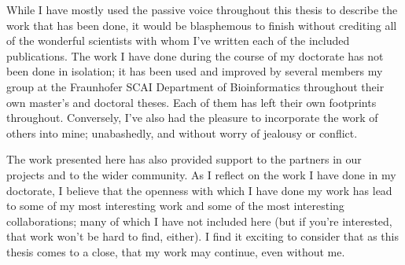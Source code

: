While I have mostly used the passive voice throughout this thesis to describe the work that has been done, it would be blasphemous to finish without crediting all of the wonderful scientists with whom I've written each of the included publications.
The work I have done during the course of my doctorate has not been done in isolation; it has been used and improved by several members my group at the Fraunhofer SCAI Department of Bioinformatics throughout their own master's and doctoral theses.
Each of them has left their own footprints throughout.
Conversely, I've also had the pleasure to incorporate the work of others into mine; unabashedly, and without worry of jealousy or conflict.

The work presented here has also provided support to the partners in our projects and to the wider community.
As I reflect on the work I have done in my doctorate, I believe that the openness with which I have done my work has lead to some of my most interesting work and some of the most interesting collaborations; many of which I have not included here (but if you're interested, that work won't be hard to find, either).
I find it exciting to consider that as this thesis comes to a close, that my work may continue, even without me.
